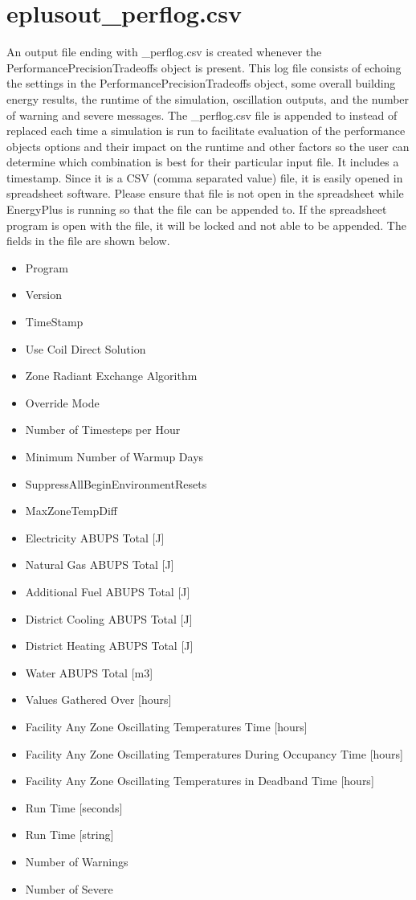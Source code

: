 \section{eplusout\_perflog.csv}

An output file ending with \_perflog.csv is created whenever the PerformancePrecisionTradeoffs object is present. This log file consists of echoing the settings in the PerformancePrecisionTradeoffs object,
some overall building energy results, the runtime of the simulation, oscillation outputs, and the number of warning and severe messages. The \_perflog.csv
file is appended to instead of replaced each time a simulation is run to facilitate evaluation of the performance objects options and their impact on the runtime and other factors so
the user can determine which combination is best for their particular input file. It includes a timestamp. Since it is a CSV (comma separated value) file, it is easily opened in spreadsheet software. Please ensure that file is
not open in the spreadsheet while EnergyPlus is running so that the file can be appended to. If the spreadsheet program is open with the file, it will be locked and not able to be appended. The fields in the
file are shown below.


\begin{itemize}
\item
  Program
\item
  Version
\item
  TimeStamp
\item
  Use Coil Direct Solution
\item
  Zone Radiant Exchange Algorithm
\item
  Override Mode
\item
  Number of Timesteps per Hour
\item
  Minimum Number of Warmup Days
\item
  SuppressAllBeginEnvironmentResets
\item
  MaxZoneTempDiff
\item
  Electricity ABUPS Total [J]
\item
  Natural Gas ABUPS Total [J]
\item
  Additional Fuel ABUPS Total [J]
\item
  District Cooling ABUPS Total [J]
\item
  District Heating ABUPS Total [J]
\item
  Water ABUPS Total [m3]
\item
  Values Gathered Over [hours]
\item
  Facility Any Zone Oscillating Temperatures Time [hours]
\item
  Facility Any Zone Oscillating Temperatures During Occupancy Time [hours]
\item
  Facility Any Zone Oscillating Temperatures in Deadband Time [hours]
\item
  Run Time [seconds]
\item
  Run Time [string]
\item
  Number of Warnings
\item
  Number of Severe
\end{itemize}


